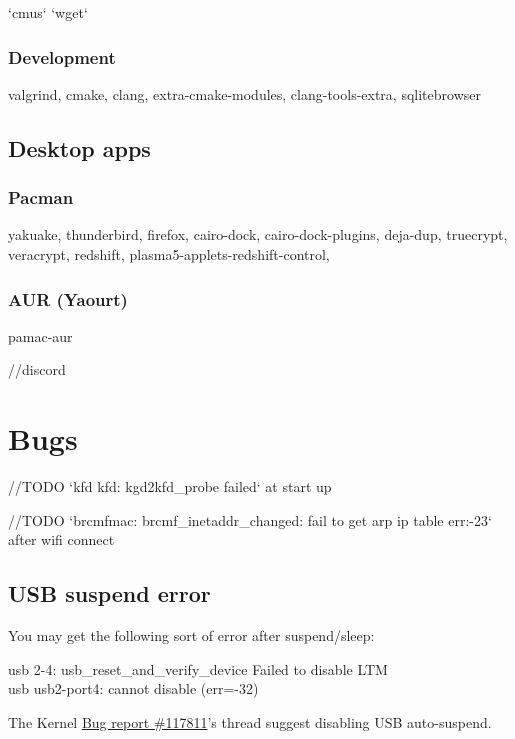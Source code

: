 `cmus`
`wget`

\subsubsection{Development}

valgrind, cmake, clang, extra-cmake-modules, clang-tools-extra, 
sqlitebrowser

\subsection{Desktop apps}


\subsubsection{Pacman}

yakuake, thunderbird, firefox, cairo-dock, cairo-dock-plugins, deja-dup, truecrypt, veracrypt, 
redshift, plasma5-applets-redshift-control, 


\subsubsection{AUR (Yaourt)}

pamac-aur

//discord

\section{Bugs}

//TODO `kfd kfd: kgd2kfd\_probe failed` at start up

//TODO `brcmfmac: brcmf\_inetaddr\_changed: fail to get arp ip table err:-23` after wifi connect



\subsection{USB suspend error}

You may get the following sort of error after suspend/sleep:

\begin{codeblock}
    usb 2-4: usb\_reset\_and\_verify\_device Failed to disable LTM\\
    usb usb2-port4: cannot disable (err=-32)
\end{codeblock}

The Kernel \href{https://bugzilla.kernel.org/show_bug.cgi?id=117811}{Bug report \#117811}'s thread suggest disabling USB auto-suspend.

